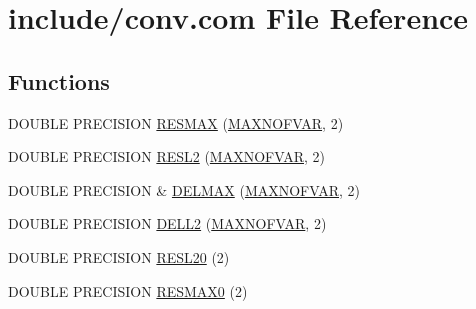 \hypertarget{home_2abonfi_2_c_f_d__codes_2_eul_f_s_83_84_2include_2conv_8com}{\section{include/conv.com File Reference}
\label{home_2abonfi_2_c_f_d__codes_2_eul_f_s_83_84_2include_2conv_8com}
}
\subsection*{Functions}
\begin{DoxyCompactItemize}
\item 
D\-O\-U\-B\-L\-E P\-R\-E\-C\-I\-S\-I\-O\-N \hyperlink{home_2abonfi_2_c_f_d__codes_2_eul_f_s_83_84_2include_2conv_8com_adf31d6b2d57a615da367e41276e2c368}{R\-E\-S\-M\-A\-X} (\hyperlink{msa20_2home_2abonfi_2_c_f_d__codes_2_eul_f_s_83_82_83_2include_2paramt_8h_ae08fa28f58a75033834af08d1f9359ce}{M\-A\-X\-N\-O\-F\-V\-A\-R}, 2)
\item 
D\-O\-U\-B\-L\-E P\-R\-E\-C\-I\-S\-I\-O\-N \hyperlink{home_2abonfi_2_c_f_d__codes_2_eul_f_s_83_84_2include_2conv_8com_a035fe6706d7b732830ffafb620f8a07b}{R\-E\-S\-L2} (\hyperlink{msa20_2home_2abonfi_2_c_f_d__codes_2_eul_f_s_83_82_83_2include_2paramt_8h_ae08fa28f58a75033834af08d1f9359ce}{M\-A\-X\-N\-O\-F\-V\-A\-R}, 2)
\item 
D\-O\-U\-B\-L\-E P\-R\-E\-C\-I\-S\-I\-O\-N \& \hyperlink{home_2abonfi_2_c_f_d__codes_2_eul_f_s_83_84_2include_2conv_8com_aa36704749632fb4cb4f4b32adae95af0}{D\-E\-L\-M\-A\-X} (\hyperlink{msa20_2home_2abonfi_2_c_f_d__codes_2_eul_f_s_83_82_83_2include_2paramt_8h_ae08fa28f58a75033834af08d1f9359ce}{M\-A\-X\-N\-O\-F\-V\-A\-R}, 2)
\item 
D\-O\-U\-B\-L\-E P\-R\-E\-C\-I\-S\-I\-O\-N \hyperlink{home_2abonfi_2_c_f_d__codes_2_eul_f_s_83_84_2include_2conv_8com_ad097628ad79bd4f6f53ba564741f0fc8}{D\-E\-L\-L2} (\hyperlink{msa20_2home_2abonfi_2_c_f_d__codes_2_eul_f_s_83_82_83_2include_2paramt_8h_ae08fa28f58a75033834af08d1f9359ce}{M\-A\-X\-N\-O\-F\-V\-A\-R}, 2)
\item 
D\-O\-U\-B\-L\-E P\-R\-E\-C\-I\-S\-I\-O\-N \hyperlink{home_2abonfi_2_c_f_d__codes_2_eul_f_s_83_84_2include_2conv_8com_a6cae5dab4b3be52cf1bc44b46eb1d76a}{R\-E\-S\-L20} (2)
\item 
D\-O\-U\-B\-L\-E P\-R\-E\-C\-I\-S\-I\-O\-N \hyperlink{home_2abonfi_2_c_f_d__codes_2_eul_f_s_83_84_2include_2conv_8com_a8567ba07a46a456519bee5aa5a38b1da}{R\-E\-S\-M\-A\-X0} (2)
\item 

\end{DoxyCompactItemize}
